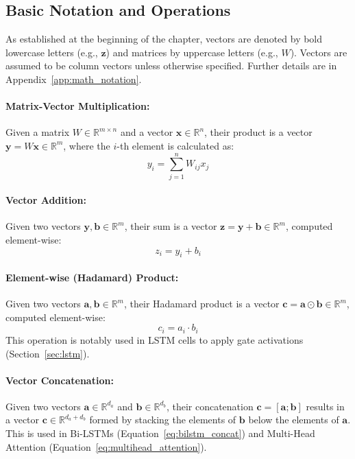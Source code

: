 \begin{appendices}
  \subsection{Basic Notation and Operations}
  As established at the beginning of the chapter, vectors are denoted by bold lowercase letters (e.g., \( \bm{z} \)) and matrices by uppercase letters (e.g., \( W \)). Vectors are assumed to be column vectors unless otherwise specified. Further details are in Appendix~\ref{app:math_notation}.

  \paragraph{Matrix-Vector Multiplication:}
  Given a matrix \( W \in \mathbb{R}^{m \times n} \) and a vector \( \bm{x} \in \mathbb{R}^n \), their product is a vector \( \bm{y} = W\bm{x} \in \mathbb{R}^m \), where the \( i \)-th element is calculated as:
  \begin{equation}
    y_i = \sum_{j=1}^{n} W_{ij} x_j
  \end{equation}

  \paragraph{Vector Addition:}
  Given two vectors \( \bm{y}, \bm{b} \in \mathbb{R}^m \), their sum is a vector \( \bm{z} = \bm{y} + \bm{b} \in \mathbb{R}^m \), computed element-wise:
  \begin{equation}
    z_i = y_i + b_i
  \end{equation}

  \paragraph{Element-wise (Hadamard) Product:}
  Given two vectors \( \bm{a}, \bm{b} \in \mathbb{R}^m \), their Hadamard product is a vector \( \bm{c} = \bm{a} \odot \bm{b} \in \mathbb{R}^m \), computed element-wise:
  \begin{equation}
    c_i = a_i \cdot b_i
  \end{equation}
  This operation is notably used in LSTM cells to apply gate activations (Section~\ref{sec:lstm}).

  \paragraph{Vector Concatenation:}
  Given two vectors \( \bm{a} \in \mathbb{R}^{d_a} \) and \( \bm{b} \in \mathbb{R}^{d_b} \), their concatenation \( \bm{c} = [\bm{a} ; \bm{b}] \) results in a vector \( \bm{c} \in \mathbb{R}^{d_a + d_b} \) formed by stacking the elements of \( \bm{b} \) below the elements of \( \bm{a} \). This is used in Bi-LSTMs (Equation~\ref{eq:bilstm_concat}) and Multi-Head Attention (Equation~\ref{eq:multihead_attention}).


\end{appendices}
